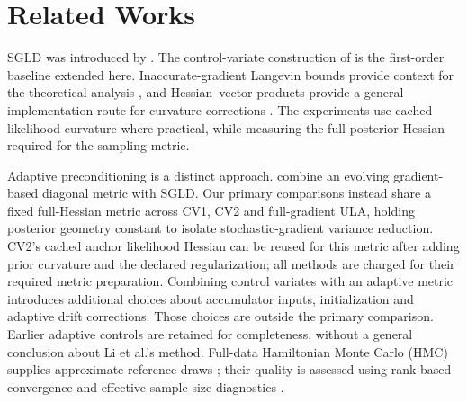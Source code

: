 \section{Related Works}\label{sec:related}
SGLD was introduced by \citet{welling2011}. The control-variate construction of \citet{baker2017} is the first-order baseline extended here. Inaccurate-gradient Langevin bounds provide context for the theoretical analysis \citep{dalalyan2017}, and Hessian--vector products provide a general implementation route for curvature corrections \citep{pearlmutter1994}. The experiments use cached likelihood curvature where practical, while measuring the full posterior Hessian required for the sampling metric.

Adaptive preconditioning is a distinct approach. \citet{li2016psgld} combine an evolving gradient-based diagonal metric with SGLD. Our primary comparisons instead share a fixed full-Hessian metric across CV1, CV2 and full-gradient ULA, holding posterior geometry constant to isolate stochastic-gradient variance reduction. CV2's cached anchor likelihood Hessian can be reused for this metric after adding prior curvature and the declared regularization; all methods are charged for their required metric preparation. Combining control variates with an adaptive metric introduces additional choices about accumulator inputs, initialization and adaptive drift corrections. Those choices are outside the primary comparison. Earlier adaptive controls are retained for completeness, without a general conclusion about Li et al.'s method. Full-data Hamiltonian Monte Carlo (HMC) supplies approximate reference draws \citep{neal2012hmc}; their quality is assessed using rank-based convergence and effective-sample-size diagnostics \citep{vehtari2021rank}.
